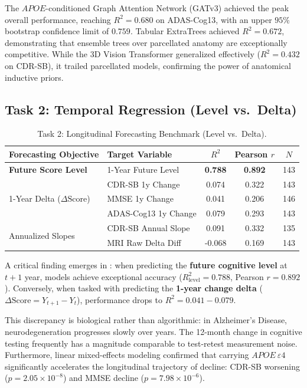 \documentclass[journal,twocolumn]{IEEEtran}
\newcommand{\APOE}{\textit{APOE}}
\begin{document}
The $\APOE$-conditioned Graph Attention Network (GATv3) achieved the peak overall performance, reaching $R^2 = \mathbf{0.680}$ on ADAS-Cog13, with an upper $95\%$ bootstrap confidence limit of $\mathbf{0.759}$. Tabular ExtraTrees achieved $R^2 = 0.672$, demonstrating that ensemble trees over parcellated anatomy are exceptionally competitive. While the 3D Vision Transformer generalized effectively ($R^2 = 0.432$ on CDR-SB), it trailed parcellated models, confirming the power of anatomical inductive priors.

\subsection{Task 2: Temporal Regression (Level vs.\ Delta)}
\begin{table}[h]
\centering
\caption{Task 2: Longitudinal Forecasting Benchmark (Level vs.\ Delta).}
\label{tab:temporal}
\begin{tabular}{llccc}
\toprule
Forecasting Objective & Target Variable & $R^2$ & Pearson $r$ & $N$ \\
\midrule
\textbf{Future Score Level} & 1-Year Future Level & \textbf{0.788} & \textbf{0.892} & 143 \\
\midrule
\multirow{3}{*}{1-Year Delta ($\Delta\text{Score}$)} 
 & CDR-SB 1y Change & 0.074 & 0.322 & 143 \\
 & MMSE 1y Change & 0.041 & 0.206 & 146 \\
 & ADAS-Cog13 1y Change & 0.079 & 0.293 & 143 \\
\midrule
\multirow{2}{*}{Annualized Slopes} 
 & CDR-SB Annual Slope & 0.091 & 0.332 & 135 \\
 & MRI Raw Delta Diff & -0.068 & 0.169 & 143 \\
\bottomrule
\end{tabular}
\end{table}

A critical finding emerges in : when predicting the \textbf{future cognitive level} at $t+1$ year, models achieve exceptional accuracy ($R^2_{\text{level}} = \mathbf{0.788}$, Pearson $r = 0.892$). Conversely, when tasked with predicting the \textbf{1-year change delta} ($\Delta \text{Score} = Y_{t+1} - Y_t$), performance drops to $R^2 = 0.041 - 0.079$. 

This discrepancy is biological rather than algorithmic: in Alzheimer's Disease, neurodegeneration progresses slowly over years. The 12-month change in cognitive testing frequently has a magnitude comparable to test-retest measurement noise. Furthermore, linear mixed-effects modeling confirmed that carrying $\APOE\ \varepsilon4$ significantly accelerates the longitudinal trajectory of decline: CDR-SB worsening ($p = 2.05 \times 10^{-8}$) and MMSE decline ($p = 7.98 \times 10^{-6}$).
\end{document}
